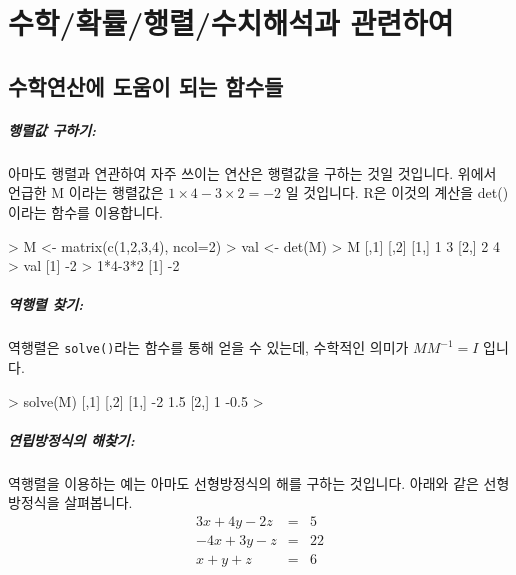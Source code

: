 


%
%
%

\chapter{수학/확률/행렬/수치해석과 관련하여}

\section{수학연산에 도움이 되는 함수들}

\paragraph{행렬값 구하기: }  아마도 행렬과 연관하여 자주 쓰이는 연산은 행렬값을 구하는 것일 것입니다. 
위에서 언급한 M 이라는 행렬값은 $1\times 4 - 3\times 2 = -2$ 일 것입니다. 
R은 이것의 계산을 det()이라는 함수를 이용합니다. 

\begin{Schunk}
\begin{Soutput}
> M <- matrix(c(1,2,3,4), ncol=2)
> val <- det(M)
> M
     [,1] [,2]
[1,]    1    3
[2,]    2    4
> val
[1] -2
> 1*4-3*2
[1] -2
\end{Soutput}
\end{Schunk}


\paragraph{역행렬 찾기:} 역행렬은 \texttt{solve()}라는 함수를 통해 얻을 수 있는데, 수학적인 의미가 $M M^{-1} = I$ 입니다.

\begin{Schunk}
\begin{Soutput}
> solve(M)
     [,1] [,2]
[1,]   -2  1.5
[2,]    1 -0.5
>
\end{Soutput}
\end{Schunk}


\paragraph{연립방정식의 해찾기:} 역행렬을 이용하는 예는 아마도 선형방정식의 해를 구하는 것입니다. 
아래와 같은 선형방정식을 살펴봅니다. 
\begin{eqnarray}
3x + 4y - 2z & = & 5 \\
-4x + 3y - z & = & 22 \\
x + y + z & = & 6
\end{eqnarray}

